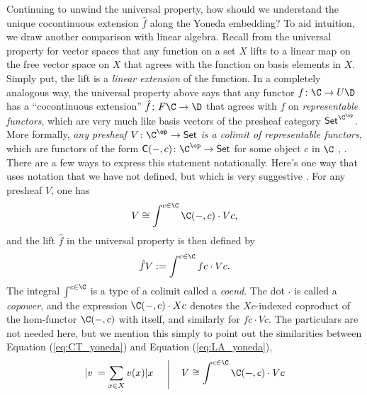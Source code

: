 Continuing to unwind the universal property, how should we understand the unique cocontinuous extension $\hat f$ along the Yoneda embedding? To aid intuition, we draw another comparison with linear algebra. Recall from the universal property for vector spaces that any function on a set $X$ lifts to a linear map on the free vector space on $X$ that agrees with the function on basis elements in $X$. Simply put, the lift is a \textit{linear extension} of the function. In a completely analogous way, the universal property above says that any functor $f\colon \C\to U\D$ has a ``cocontinuous extension'' $\hat f\colon F\C\to \D$ that agrees with $f$ on \emph{representable functors}, which are very much like basis vectors of the presheaf category $\mathsf{Set}^{\C^{\op}}$. More formally, \textit{any presheaf $V\colon \C^{\op}\to \mathsf{Set}$ is a colimit of representable functors}, which are functors of the form $\mathsf{C}(-,c)\colon \C^{\op}\to\mathsf{Set}$ for some object $c$ in $\C$ \cite[Theorem 6.5.8]{riehl2017category}, \cite[Theorem 6.2.17]{leinster2014basic}. There are a few ways to express this statement notationally. Here's one way that uses notation that we have not defined, but which is very suggestive \cite[Proposition 2.2.1]{loregian2015coend}. For any presheaf $V$, one has
\begin{equation}\label{eq:CT_yoneda}
V\cong \int^{c\in\C} \C(-,c)\cdot Vc,
\end{equation}
and the lift $\hat f$ in the universal property is then defined by
\begin{equation}\label{eq:CT_lift}
\hat{f}V:= \int^{c\in\C} fc \cdot Vc.
\end{equation}
The integral $\int^{c\in \C}$ is a type of a colimit called a \textit{coend}. The dot $\cdot$ is called a \textit{copower}, and the expression $\C(-,c)\cdot Xc$ denotes the $Xc$-indexed coproduct of the hom-functor $\C(-,c)$ with itself, and similarly for $fc\cdot Vc$. The particulars are not needed here, but we mention this simply to point out the similarities between Equation (\ref{eq:CT_yoneda}) and Equation (\ref{eq:LA_yoneda}),
\[
\begin{array}{c@{\hspace{3ex}}|@{\hspace{3ex}}c}
|v\>=\displaystyle\sum_{x\in X} v(x)|x\>
&
V\cong \displaystyle\int^{c\in\C} \C(-,c)\cdot Vc
\end{array} 
\]
